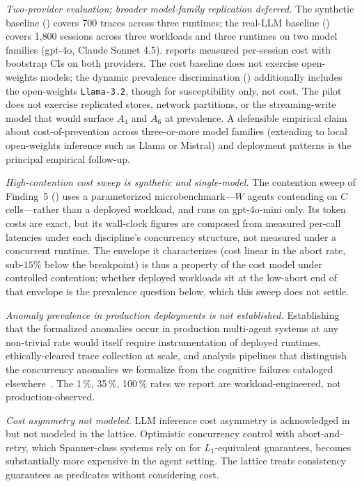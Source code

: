 \documentclass[journal,compsoc,10pt]{IEEEtran}
\providecommand{\citep}{\cite}
\theoremstyle{definition}
\theoremstyle{remark}
\begin{document}
\emph{Two-provider evaluation; broader model-family replication
deferred.} The synthetic baseline ()
covers 700 traces across three runtimes; the real-LLM baseline
() covers 1{,}800 sessions
across three workloads and three runtimes on two model families
(gpt-4o, Claude Sonnet 4.5).  reports
measured per-session cost with bootstrap CIs on both providers.
The cost baseline does not exercise open-weights models; the dynamic
prevalence discrimination () additionally
includes the open-weights \texttt{Llama-3.2}, though for
susceptibility only, not cost. The pilot does not exercise replicated
stores, network partitions, or the streaming-write model that would
surface $A_4$ and $A_6$ at prevalence. A defensible
empirical claim about cost-of-prevention across three-or-more
model families (extending to local open-weights inference such
as Llama or Mistral) and deployment patterns is the principal
empirical follow-up.

\emph{High-contention cost sweep is synthetic and single-model.}
The contention sweep of Finding~5 () uses a
parameterized microbenchmark---$W$ agents contending on $C$
cells---rather than a deployed workload, and runs on gpt-4o-mini
only. Its token costs are exact, but its wall-clock figures are
composed from measured per-call latencies under each discipline's
concurrency structure, not measured under a concurrent runtime. The
envelope it characterizes (cost linear in the abort rate, sub-$15\%$
below the breakpoint) is thus a property of the cost model under
controlled contention; whether deployed workloads sit at the
low-abort end of that envelope is the prevalence question below,
which this sweep does not settle.

\emph{Anomaly prevalence in production deployments is not
established.} Establishing that the formalized anomalies occur in
production multi-agent systems at any non-trivial rate would itself
require instrumentation of deployed runtimes, ethically-cleared
trace collection at scale, and analysis pipelines that distinguish
the concurrency anomalies we formalize from the cognitive failures
cataloged elsewhere~\citep{CemriEtAl2025MAST}. The 1\,\%, 35\,\%,
100\,\% rates we report are workload-engineered, not
production-observed.

\emph{Cost asymmetry not modeled.}
LLM inference cost asymmetry is acknowledged in
 but not modeled in the lattice. Optimistic
concurrency control with abort-and-retry, which Spanner-class systems
rely on for $L_1$-equivalent guarantees, becomes substantially more
expensive in the agent setting. The lattice treats consistency
guarantees as predicates without considering cost.
\end{document}
